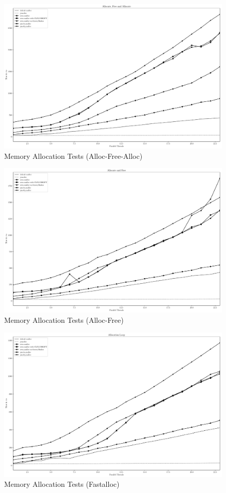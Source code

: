 \begin{figure}
    \centering
    \caption{Memory Allocation Tests (Alloc-Free-Alloc)}\label{plot:afa}
    \includegraphics[scale=0.35]{malloc/alloc_free_alloc.pdf}
\end{figure}


\begin{figure}
    \centering
    \caption{Memory Allocation Tests (Alloc-Free)}\label{plot:af}
    \includegraphics[scale=0.35]{malloc/alloc_free.pdf}
\end{figure}

\begin{figure}
    \centering
    \caption{Memory Allocation Tests (Fastalloc)}\label{plot:fastalloc}
    \includegraphics[scale=0.35]{malloc/fastalloc.pdf}
\end{figure}

